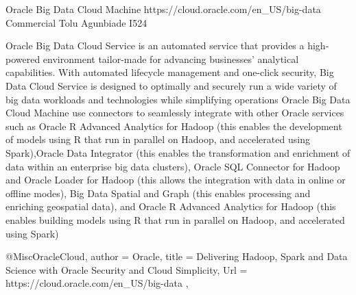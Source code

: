 Oracle Big Data Cloud Machine 
https://cloud.oracle.com/en_US/big-data 
Commercial
Tolu Agunbiade 
I524


Oracle Big Data Cloud Service is an automated service that provides a
high-powered environment tailor-made for advancing businesses' analytical
capabilities. With automated lifecycle management and one-click security, Big
Data Cloud Service is designed to optimally and securely run a wide variety of
big data workloads and technologies while simplifying
operations\cite{OracleCloud} Oracle Big Data Cloud Machine use connectors to
seamlessly integrate with other Oracle services such as Oracle R Advanced
Analytics for Hadoop (this enables the development of models using R that run in
parallel on Hadoop, and accelerated using Spark),Oracle Data Integrator (this
enables the transformation and enrichment of data within an enterprise big data
clusters), Oracle SQL Connector for Hadoop and Oracle Loader for Hadoop (this
allows the integration with data in online or offline modes), Big Data Spatial
and Graph (this enables processing and enriching geospatial data), and Oracle R
Advanced Analytics for Hadoop (this enables building models using R that run in
parallel on Hadoop, and accelerated using Spark)\cite{OracleCloud}


@Misc{OracleCloud, 
author = {Oracle}, 
title = {Delivering Hadoop, Spark and Data Science with Oracle Security and Cloud Simplicity}, 
Url = {https://cloud.oracle.com/en_US/big-data },
}
